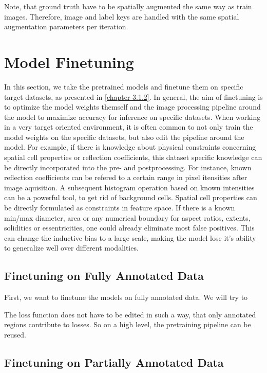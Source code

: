 Note, that ground truth have to be spatially augmented the same way as train images. Therefore, image and label keys are handled with the same spatial augmentation parameters per iteration. 


\section{Model Finetuning}

In this section, we take the pretrained models and finetune them on specific target datasets, as presented in \ref{chapter 3.1.2}. In general, the aim of finetuning is to optimize the model weights themself and the image processing pipeline around the model to maximize accuracy for inference on specific datasets. When working in a very target oriented environment, it is often common to not only train the model weights on the specific datasets, but also edit the pipeline around the model. For example, if there is knowledge about physical constraints concerning spatial cell properties or reflection coefficients, this dataset specific knowledge can be directly incorporated into the pre- and postprocessing. For instance, known reflection coefficients can be refered to a certain range in pixel itensities after image aquisition. A subsequent histogram operation based on known intensities can be a powerful tool, to get rid of background cells. Spatial cell properties can be directly formulated as constraints in feature space. If there is a known min/max diameter, area or any numerical boundary for aspect ratios, extents, solidities or essentricities, one could already eliminate most false positives. This can change the inductive bias to a large scale, making the model lose it's ability to generalize well over different modalities.

\subsection{Finetuning on Fully Annotated Data}

First, we want to finetune the models on fully annotated data. We will try to 


The loss function does not have to be edited in such a way, that only annotated regions contribute to losses. So on a high level, the pretraining pipeline can be reused. 

\subsection{Finetuning on Partially Annotated Data}

